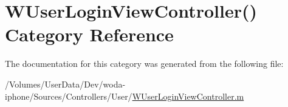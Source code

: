 \hypertarget{category_w_user_login_view_controller_07_08}{\section{W\-User\-Login\-View\-Controller() Category Reference}
\label{category_w_user_login_view_controller_07_08}
}


The documentation for this category was generated from the following file\-:\begin{DoxyCompactItemize}
\item 
/\-Volumes/\-User\-Data/\-Dev/woda-\/iphone/\-Sources/\-Controllers/\-User/\hyperlink{_w_user_login_view_controller_8m}{W\-User\-Login\-View\-Controller.\-m}\end{DoxyCompactItemize}
